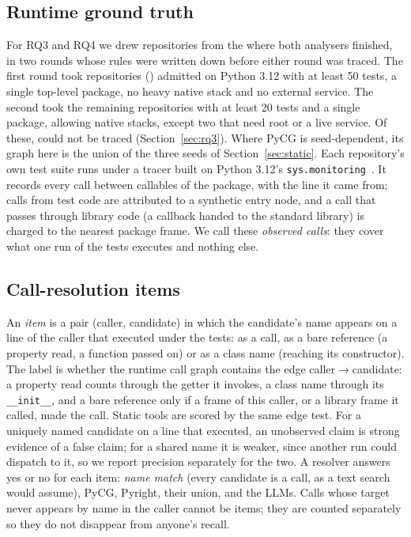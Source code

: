 \documentclass[conference]{IEEEtran}
\begin{document}
\subsection{Runtime ground truth}

For RQ3 and RQ4 we drew repositories from the \nStaticOk{} where both analysers finished, in two
rounds whose rules were written down before either round was traced. The first round took \nRoundOne{}
repositories (\roundOneStrata) admitted on Python 3.12 with at least 50 tests, a single top-level
package, no heavy native stack and no external service. The second took the \nRoundTwo{} remaining
repositories with at least 20 tests and a single package, allowing native stacks, except two that
need root or a live service. Of these, \nRuntimeExcluded{} could not be traced (Section~\ref{sec:rq3}).
Where PyCG is seed-dependent, its graph here is the union of the three seeds of Section~\ref{sec:static}. Each
repository's own test suite runs under a tracer built on Python 3.12's
\texttt{sys.monitoring}~\cite{pep669}. It records every call between callables of the package,
with the line it came from; calls from test code are attributed to a synthetic entry node, and a
call that passes through library code (a callback handed to the standard library) is charged to
the nearest package frame. We call these \emph{observed calls}: they cover what one run of the tests executes and nothing
else.

\subsection{Call-resolution items}

An \emph{item} is a pair (caller, candidate) in which the candidate's name appears on a line of
the caller that executed under the tests: as a call, as a bare reference (a property read, a
function passed on) or as a class name (reaching its constructor). The label is whether the runtime call graph contains the edge caller$\to$candidate: a property
read counts through the getter it invokes, a class name through its \texttt{\_\_init\_\_}, and a
bare reference only if a frame of this caller, or a library frame it called, made the call. Static
tools are scored by the same edge test. For a uniquely named candidate on a line that executed, an
unobserved claim is strong evidence of a false claim; for a shared name it is weaker, since
another run could dispatch to it, so we report precision separately for the two. A resolver answers yes or no for each item: \emph{name match} (every candidate is a
call, as a text search would assume), PyCG, Pyright, their union, and the LLMs. Calls whose
target never appears by name in the caller cannot be items; they are counted separately so they
do not disappear from anyone's recall.
\end{document}
